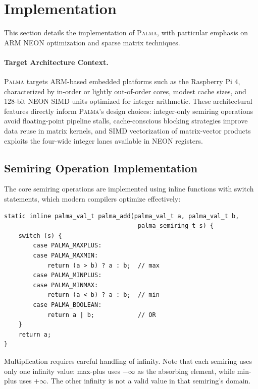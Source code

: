 \documentclass[11pt,a4paper]{article}
\theoremstyle{plain}
\theoremstyle{definition}
\newcommand{\palma}{\textsc{Palma}}
\begin{document}
\section{Implementation}
\label{sec:implementation}

This section details the implementation of \palma{}, with particular emphasis on ARM NEON optimization and sparse matrix techniques.

\paragraph{Target Architecture Context.}
\palma{} targets ARM-based embedded platforms such as the Raspberry Pi 4, characterized by in-order or lightly out-of-order cores, modest cache sizes, and 128-bit NEON SIMD units optimized for integer arithmetic. These architectural features directly inform \palma{}'s design choices: integer-only semiring operations avoid floating-point pipeline stalls, cache-conscious blocking strategies improve data reuse in matrix kernels, and SIMD vectorization of matrix-vector products exploits the four-wide integer lanes available in NEON registers.

\subsection{Semiring Operation Implementation}

The core semiring operations are implemented using inline functions with switch statements, which modern compilers optimize effectively:

\begin{lstlisting}[caption={Semiring addition implementation}]
static inline palma_val_t palma_add(palma_val_t a, palma_val_t b,
                                     palma_semiring_t s) {
    switch (s) {
        case PALMA_MAXPLUS:
        case PALMA_MAXMIN:
            return (a > b) ? a : b;  // max
        case PALMA_MINPLUS:
        case PALMA_MINMAX:
            return (a < b) ? a : b;  // min
        case PALMA_BOOLEAN:
            return a | b;            // OR
    }
    return a;
}
\end{lstlisting}

Multiplication requires careful handling of infinity. Note that each semiring uses only one infinity value: max-plus uses $-\infty$ as the absorbing element, while min-plus uses $+\infty$. The other infinity is not a valid value in that semiring's domain.
\end{document}
